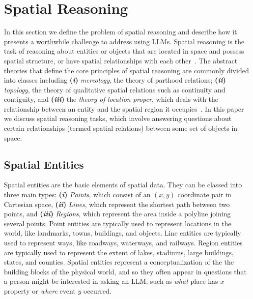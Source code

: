 \section{Spatial Reasoning}
\label{section:background}

In this section we define the problem of spatial reasoning and describe how it presents a worthwhile challenge to address using LLMs.
%
Spatial reasoning is the task of reasoning about entities or objects that are located in space and possess spatial structure, or have spatial relationships with each other~\cite{Varzi2007}.
The abstract theories that define the core principles of spatial reasoning are commonly divided into classes including 
\textbf{(\textit{i})} \textit{mereology}, the theory of parthood relations;
\textbf{(\textit{ii})} \textit{topology}, the theory of qualitative spatial relations such as continuity and contiguity, and 
\textbf{(\textit{iii})} the \textit{theory of location proper}, which deals with the relationship between an entity and the spatial region it
occupies~\cite{Varzi2007}.
%
In this paper we discuss spatial reasoning tasks, which involve answering questions about certain relationships (termed spatial relations) between some set of objects in space.



\subsection{Spatial Entities}
Spatial entities are the basic elements of spatial data.
They can be classed into three main types: \textbf{(\textit{i})} \textit{Points}, which consist of an $(x,y)$ coordinate pair in Cartesian space, \textbf{(\textit{ii})} \textit{Lines}, which represent the shortest path between two points, and \textbf{(\textit{iii})} \textit{Regions}, which represent the area inside a polyline joining several points. 
Point entities are typically used to represent locations in the world, like landmarks, towns, buildings, and objects.
Line entities are typically used to represent ways, like roadways, waterways, and railways.
Region entities are typically used to represent the extent of lakes, stadiums, large buildings, states, and counties.
Spatial entities represent a conceptualization of the the building blocks of the physical world, and so they often appear in questions that a person might be interested in asking an LLM, such as \textit{what} place has $x$ property or \textit{where} event $y$ occurred.


